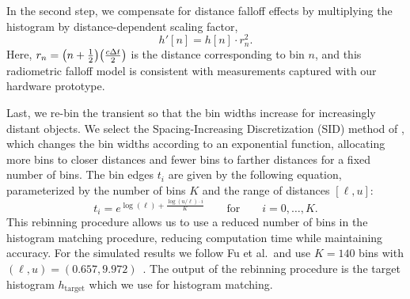 \vspace{0.8em}
In the second step, we compensate for distance falloff effects by multiplying the histogram
by distance-dependent scaling factor,
\begin{equation}
    h'[n] = h[n] \cdot r_n^2.
  \label{eq:h_scaled}
\end{equation}
Here, $r_n= \paren*{n + \frac12}\paren*{\frac{c\Delta t}{2}}$ is the distance
corresponding to bin $n$, and this radiometric falloff model is consistent with
measurements captured with our hardware prototype.

\vspace{0.8em}
Last, we re-bin the transient so that the bin widths increase for increasingly
distant objects. We select the Spacing-Increasing Discretization
(SID) method of \cite{Fu2018}, which changes the bin widths according to an  
exponential function, allocating more bins to closer distances and fewer
bins to farther distances for a fixed number of bins. The bin edges $t_i$ are
given by the following equation,
parameterized by the number of bins $K$ and the range of distances $[\ell, u]$: 
\begin{equation}
  t_i = e^{\log(\ell) + \frac{\log(u/\ell) \cdot i}{K}}  \qquad\text{for}\qquad i = 0,\ldots, K.
  \label{eq:sid_bin_edges}
\end{equation}
This rebinning procedure allows us to use a reduced number of bins in the histogram
matching procedure, reducing computation time while maintaining accuracy. For
the simulated results we follow Fu et al.\ and use $K = 140$ bins with $(\ell, u)
= (0.657, 9.972)$~\cite{Fu2018}. The output of the rebinning procedure is the
target histogram $h_\text{target}$ which we use for histogram matching. 



